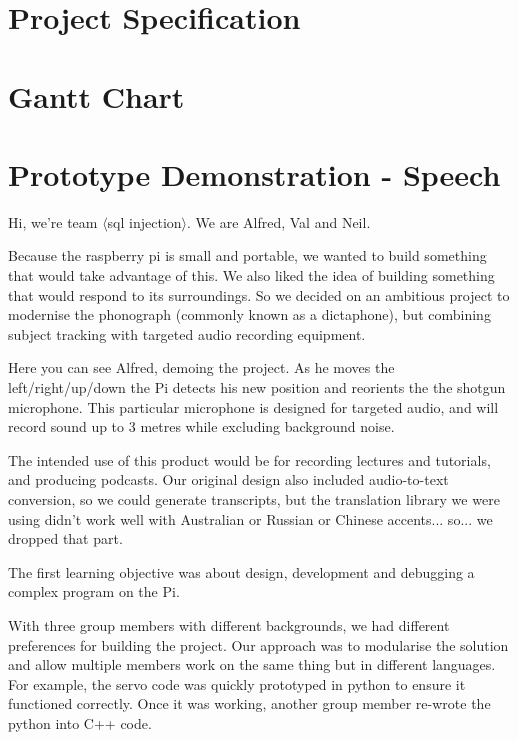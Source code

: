 \documentclass[11pt,a4paper,titlepage]{report}
\begin{document}
\begin{appendices}


\chapter{Project Specification}



\chapter{Gantt Chart}



\chapter{Prototype Demonstration - Speech}

\newpage

Hi, we're team $\langle$sql injection$\rangle$. We are Alfred, Val and Neil.

Because the raspberry pi is small and portable, we wanted to build something that would take advantage of this. We also liked the idea of building something that would respond to its surroundings. So we decided on an ambitious project to modernise the phonograph (commonly known as a dictaphone), but combining subject tracking with targeted audio recording equipment.

Here you can see Alfred, demoing the project. As he moves the left/right/up/down the Pi detects his new position and reorients the the shotgun microphone. This particular microphone is designed for targeted audio, and will record sound up to 3 metres while excluding background noise. 

The intended use of this product would be for recording lectures and tutorials, and producing podcasts. Our original design also included audio-to-text conversion, so we could generate transcripts, but the translation library we were using didn’t work well with Australian or Russian or Chinese accents... so... we dropped that part.

The first learning objective was about design, development and debugging a complex program on the Pi. 

With three group members with different backgrounds, we had different preferences for building the project. Our approach was to modularise the solution and allow multiple members work on the same thing but in different languages. For example, the servo code was quickly prototyped in python to ensure it functioned correctly. Once it was working, another group member re-wrote the python into C++ code. 


\end{appendices}
\end{document}
